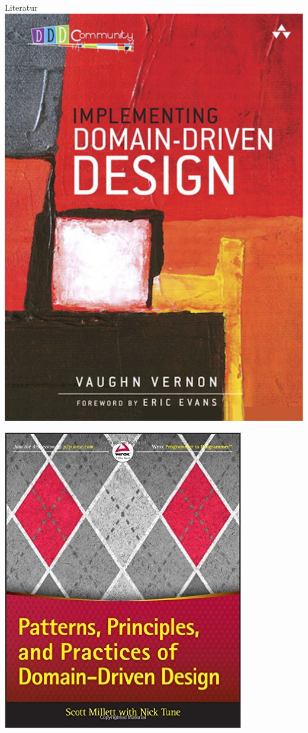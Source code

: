 \begin{frame}{Literatur}
\includegraphics[width=.4\framewidth]{pics/vernon.jpg}

\vspace{-9em}
\begin{center}
\includegraphics[width=.4\framewidth]{pics/millett.jpg}
\end{center}
\end{frame}

